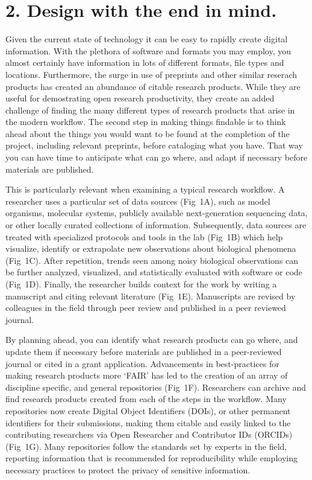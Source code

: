 \documentclass[10pt,letterpaper]{article}
\newcommand{\rulemajor}[1]{\section*{#1}}
\begin{document}
\rulemajor{2. Design with the end in mind.}

Given the current state of technology it can be easy to rapidly create digital
information. With the plethora of software and formats you may employ, you
almost certainly have information in lots of different formats, file types and
locations. Furthermore, the surge in use of preprints and other similar reserach 
products has created an abundance of citable research products. While they are useful
for demostrating open research productivity, they create an added challenge of finding 
the many different types of research products that arise in the modern workflow.
The second step in making things findable is to think ahead about
the things you would want to be found at the completion of the project, including
relevant preprints, before cataloging what you have. That way you can have time to 
anticipate what can go where, and adapt if necessary before materials are published.

This is particularly relevant when examining a typical research workflow. A
researcher uses a particular set of data sources (Fig~1A), such
as model organisms, molecular systems, publicly available next-generation
sequencing data, or other locally curated collections of information.
Subsequently, data sources are treated with specialized protocols and tools in
the lab (Fig~1B) which help visualize, identify or extrapolate
new observations about biological phenomena (Fig~1C). After
repetition, trends seen among noisy biological observations can be further
analyzed, visualized, and statistically evaluated with software or code
(Fig~1D). Finally, the researcher builds context for the work by
writing a manuscript and citing relevant literature (Fig~1E).
Manuscripts are revised by colleagues in the field through peer review
and published in a peer reviewed journal.

By planning ahead, you can identify what research products can go where, and
update them if necessary before materials are published in a peer-reviewed
journal or cited in a grant application. Advancements in best-practices
for making research products more `FAIR' has led to the creation of an array
of discipline specific, and general repositories\cite{PLOS2020} (Fig~1F). 
Researchers can archive and find research products created from each of the steps in the workflow.
Many repositories now create Digital Object Identifiers (DOIs)\cite{DOI2020}, or
other permanent identifiers for their submissions, making them citable and
easily linked to the contributing researchers via Open Researcher and Contributor
IDs (ORCIDs)\cite{ORCID2020} (Fig~1G). Many repositories follow the standards
set by experts in the field, reporting information that is recommended for
reproducibility while employing necessary practices to protect the privacy of
sensitive information.
\end{document}
